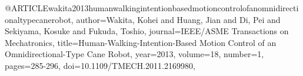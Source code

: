 @ARTICLE{wakita2013humanwalkingintentionbasedmotioncontrolofanomnidirectionaltypecanerobot,
author={Wakita, Kohei and Huang, Jian and Di, Pei and Sekiyama, Kosuke and Fukuda, Toshio},
journal={IEEE/ASME Transactions on Mechatronics}, 
title={Human-Walking-Intention-Based Motion Control of an Omnidirectional-Type Cane Robot}, 
year={2013},
volume={18},
number={1},
pages={285-296},
doi={10.1109/TMECH.2011.2169980},}
